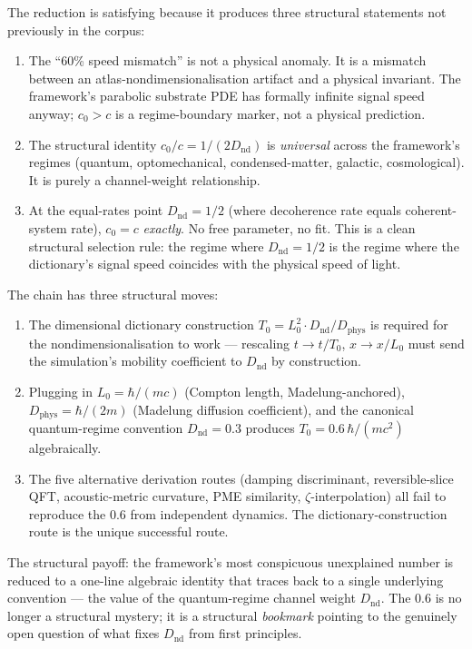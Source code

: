 \documentclass[11pt,a4paper]{article}
\begin{document}
The reduction is satisfying because it produces three structural statements not previously in the corpus:

\begin{enumerate}[noitemsep]
\item The ``60\% speed mismatch'' is not a physical anomaly. It is a mismatch between an atlas-nondimensionalisation artifact and a physical invariant. The framework's parabolic substrate PDE has formally infinite signal speed anyway; $c_0 > c$ is a regime-boundary marker, not a physical prediction.
\item The structural identity $c_0/c = 1/(2 D_\mathrm{nd})$ is \emph{universal} across the framework's regimes (quantum, optomechanical, condensed-matter, galactic, cosmological). It is purely a channel-weight relationship.
\item At the equal-rates point $D_\mathrm{nd} = 1/2$ (where decoherence rate equals coherent-system rate), $c_0 = c$ \emph{exactly}. No free parameter, no fit. This is a clean structural selection rule: the regime where $D_\mathrm{nd} = 1/2$ is the regime where the dictionary's signal speed coincides with the physical speed of light.
\end{enumerate}

The chain has three structural moves:

\begin{enumerate}[noitemsep]
\item The dimensional dictionary construction $T_0 = L_0^{2} \cdot D_\mathrm{nd}/D_\mathrm{phys}$ is required for the nondimensionalisation to work --- rescaling $t \to t/T_0$, $x \to x/L_0$ must send the simulation's mobility coefficient to $D_\mathrm{nd}$ by construction.
\item Plugging in $L_0 = \hbar/(mc)$ (Compton length, Madelung-anchored), $D_\mathrm{phys} = \hbar/(2m)$ (Madelung diffusion coefficient), and the canonical quantum-regime convention $D_\mathrm{nd} = 0.3$ produces $T_0 = 0.6\,\hbar/(mc^{2})$ algebraically.
\item The five alternative derivation routes (damping discriminant, reversible-slice QFT, acoustic-metric curvature, PME similarity, $\zeta$-interpolation) all fail to reproduce the 0.6 from independent dynamics. The dictionary-construction route is the unique successful route.
\end{enumerate}

The structural payoff: the framework's most conspicuous unexplained number is reduced to a one-line algebraic identity that traces back to a single underlying convention --- the value of the quantum-regime channel weight $D_\mathrm{nd}$. The 0.6 is no longer a structural mystery; it is a structural \emph{bookmark} pointing to the genuinely open question of what fixes $D_\mathrm{nd}$ from first principles.
\end{document}
